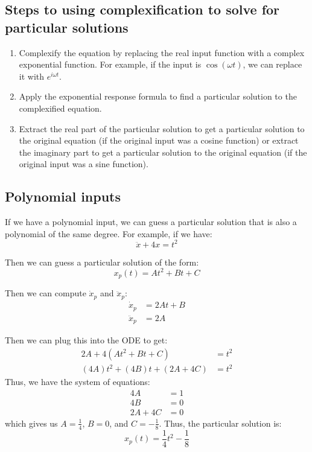 \begin{mdframed}
\subsection{Steps to using complexification to solve for particular solutions}
\begin{enumerate}
    \item Complexify the equation by replacing the real input function with a complex exponential function. For example, if the input is $\cos(\omega t)$, we can replace it with $e^{i \omega t}$.
    \item Apply the exponential response formula to find a particular solution to the complexified equation.
    \item Extract the real part of the particular solution to get a particular solution to the original equation (if the original input was a cosine function) or extract the imaginary part to get a particular solution to the original equation (if the original input was a sine function).
\end{enumerate}
\end{mdframed}

\subsection{Polynomial inputs}
If we have a polynomial input, we can guess a particular solution that is also a polynomial of the same degree. For example, if we have:
\begin{equation*}
\ddot x + 4x = t^2
\end{equation*}

Then we can guess a particular solution of the form:
\begin{equation*}
x_p(t) = At^2 + Bt + C
\end{equation*}

Then we can compute $\dot x_p$ and $\ddot x_p$:
\begin{align*}
\dot x_p &= 2At + B \\
\ddot x_p &= 2A
\end{align*}

Then we can plug this into the ODE to get:
\begin{align*}
2A + 4(At^2 + Bt + C) &= t^2 \\
(4A) t^2 + (4B) t + (2A + 4C) &= t^2
\end{align*}
Thus, we have the system of equations:
\begin{align*}
4A &= 1 \\
4B &= 0 \\
2A + 4C &= 0
\end{align*}
which gives us $A = \frac{1}{4}$, $B = 0$, and $C = -\frac{1}{8}$. Thus, the particular solution is:
\begin{equation*}
\boxed{
x_p(t) = \frac{1}{4} t^2 - \frac{1}{8}
}
\end{equation*}

